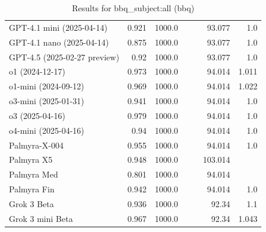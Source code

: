 \begin{table}[htp]
{\begin{tabular}{lrrrrrr}
GPT-4.1 mini (2025-04-14) & 0.921 & 1000.0 &  &  & 93.077 & 1.0 \\
GPT-4.1 nano (2025-04-14) & 0.875 & 1000.0 &  &  & 93.077 & 1.0 \\
GPT-4.5 (2025-02-27 preview) & 0.92 & 1000.0 &  &  & 93.077 & 1.0 \\
o1 (2024-12-17) & 0.973 & 1000.0 &  &  & 94.014 & 1.011 \\
o1-mini (2024-09-12) & 0.969 & 1000.0 &  &  & 94.014 & 1.022 \\
o3-mini (2025-01-31) & 0.941 & 1000.0 &  &  & 94.014 & 1.0 \\
o3 (2025-04-16) & 0.979 & 1000.0 &  &  & 94.014 & 1.0 \\
o4-mini (2025-04-16) & 0.94 & 1000.0 &  &  & 94.014 & 1.0 \\
Palmyra-X-004 & 0.955 & 1000.0 &  &  & 94.014 & 1.0 \\
Palmyra X5 & 0.948 & 1000.0 &  &  & 103.014 &  \\
Palmyra Med & 0.801 & 1000.0 &  &  & 94.014 &  \\
Palmyra Fin & 0.942 & 1000.0 &  &  & 94.014 & 1.0 \\
Grok 3 Beta & 0.936 & 1000.0 &  &  & 92.34 & 1.1 \\
Grok 3 mini Beta & 0.967 & 1000.0 &  &  & 92.34 & 1.043 \\
\bottomrule
\end{tabular}}
\caption{Results for bbq_subject:all (bbq)}
\label{fig:bbq_subject:all (bbq)}
\end{table}